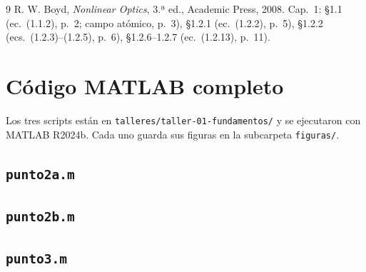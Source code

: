 \documentclass[11pt,letterpaper]{article}
\begin{document}
\begin{thebibliography}{9}
 R. W. Boyd, \emph{Nonlinear Optics}, 3.ª ed., Academic Press, 2008. Cap.~1:
§1.1 (ec.~(1.1.2), p.~2; campo atómico, p.~3), §1.2.1 (ec.~(1.2.2), p.~5), §1.2.2 (ecs.~(1.2.3)--(1.2.5), p.~6),
§1.2.6--1.2.7 (ec.~(1.2.13), p.~11).
\end{thebibliography}

\appendix
\section{Código MATLAB completo}\label{app:codigo}

Los tres scripts están en \texttt{talleres/taller-01-fundamentos/} y se ejecutaron con MATLAB R2024b.
Cada uno guarda sus figuras en la subcarpeta \texttt{figuras/}.

\subsection{\texttt{punto2a.m}}


\subsection{\texttt{punto2b.m}}


\subsection{\texttt{punto3.m}}

\end{document}
